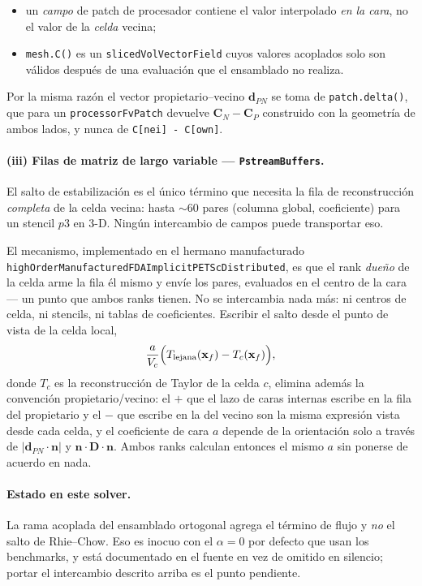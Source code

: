 \documentclass[11pt,a4paper]{article}
\newcommand{\code}[1]{\texttt{\small #1}}
\newcommand{\Dten}{\mathbf{D}}
\begin{document}
\begin{itemize}
  \item un \emph{campo} de patch de procesador contiene el valor interpolado
        \emph{en la cara}, no el valor de la \emph{celda} vecina;
  \item \code{mesh.C()} es un \code{slicedVolVectorField} cuyos valores acoplados
        solo son válidos después de una evaluación que el ensamblado no realiza.
\end{itemize}

Por la misma razón el vector propietario--vecino $\mathbf{d}_{PN}$ se toma de
\code{patch.delta()}, que para un \code{processorFvPatch} devuelve
$\mathbf{C}_{N}-\mathbf{C}_{P}$ construido con la geometría de ambos lados, y
nunca de \code{C[nei] - C[own]}.

\paragraph{(iii) Filas de matriz de largo variable --- \code{PstreamBuffers}.}
El salto de estabilización es el único término que necesita la fila de
reconstrucción \emph{completa} de la celda vecina: hasta $\sim 60$ pares
(columna global, coeficiente) para un stencil $p3$ en 3-D. Ningún intercambio de
campos puede transportar eso.

El mecanismo, implementado en el hermano manufacturado
\code{highOrderManufacturedFDAImplicitPETScDistributed}, es que el rank
\emph{dueño} de la celda arme la fila él mismo y envíe los pares, evaluados en el
centro de la cara --- un punto que ambos ranks tienen. No se intercambia nada
más: ni centros de celda, ni stencils, ni tablas de coeficientes. Escribir el
salto desde el punto de vista de la celda local,
\[
   \frac{a}{V_{c}}\Bigl( T_{\text{lejana}}(\mathbf{x}_{f})
                        - T_{c}(\mathbf{x}_{f}) \Bigr),
\]
donde $T_{c}$ es la reconstrucción de Taylor de la celda $c$, elimina además la
convención propietario/vecino: el $+$ que el lazo de caras internas escribe en la
fila del propietario y el $-$ que escribe en la del vecino son la misma
expresión vista desde cada celda, y el coeficiente de cara $a$ depende de la
orientación solo a través de $|\mathbf{d}_{PN}\!\cdot\!\mathbf{n}|$ y
$\mathbf{n}\!\cdot\!\Dten\!\cdot\!\mathbf{n}$. Ambos ranks calculan entonces el
mismo $a$ sin ponerse de acuerdo en nada.

\paragraph{Estado en este solver.} La rama acoplada del ensamblado ortogonal
agrega el término de flujo y \emph{no} el salto de Rhie--Chow. Eso es inocuo con
el $\alpha=0$ por defecto que usan los benchmarks, y está documentado en el
fuente en vez de omitido en silencio; portar el intercambio descrito arriba es el
punto pendiente.
\end{document}
